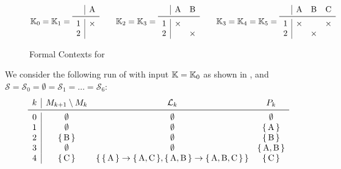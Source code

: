 \begin{Example}
  \label{exp:non-redundant-bases}
  \begin{figure}[tp]
    \centering
    \begin{equation*}
      \con K_0 = \con K_1 =
      \begin{array}{c | c}
        ~ & \text{A} \\
        \midrule
        1 & \times \\
        2 & 
      \end{array}
      \qquad
      \con K_2 = \con K_3 =
      \begin{array}{c|cc}
        ~ & \text{A} & \text{B} \\
        \midrule
        1 & \times & \\
        2 &        & \times
      \end{array}
      \qquad
      \con K_3 = \con K_4 = \con K_5 =
      \begin{array}{c|ccc}
        ~ & \text{A} & \text{B} & \text{C}\\
        \midrule
        1 & \times & & \times \\
        2 & & \times &
      \end{array}
    \end{equation*}
    \caption{Formal Contexts for }
    \label{fig:example-context-1}
  \end{figure}
  We consider the following run of  with input
  ${\mathbb{K}} = {\mathbb{K}}_0$ as shown in , and $\mathcal{S} =
  \mathcal{S}_0 = \emptyset = \mathcal{S}_1 = \ldots = \mathcal{S}_6$:
  \begin{equation*}
    \begin{array}{c|ccc}
      k & M_{k+1} \setminus M_k & \mathcal{L}_k & P_k \\
      \midrule
      0 & \emptyset      & \emptyset & \emptyset         \\
      1 & \emptyset      & \emptyset & \set{\text{A}}    \\
      2 & \set{\text{B}} & \emptyset & \set{\text{B}}    \\
      3 & \emptyset      & \emptyset & \set{\text{A}, \text{B}} \\
      4 & \set{\text{C}} & \set{\set{\text{A}} \to \set{\text{A},\text{C}},
        \set{\text{A},\text{B}} \to \set{\text{A}, \text{B}, \text{C}}} & \set{\text{C}}\\

\end{array}
\end{equation*}
\end{Example}
